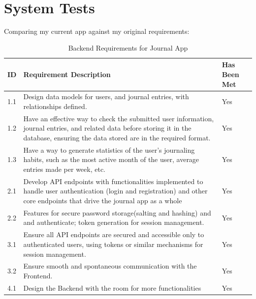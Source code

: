 \section{System Tests}
Comparing my current app against my original requirements:
\begin{table}[H]
    \centering
    \begin{tabular}{|l|p{8cm}|p{4cm}|}  
    \hline
    \textbf{ID} & \textbf{Requirement Description}& \textbf{Has Been Met} \\ \hline
    1.1 & Design data models for users, and journal entries, with relationships defined. & Yes\\ \hline
    
    1.2 & Have an effective way to check the submitted user information, journal entries, and related data before storing it in the database, ensuring the data stored are in the required format. & Yes \\ \hline
    
    1.3 & Have a way to generate statistics of the user's journaling habits, such as the most active month of the user, average entries made per week, etc. & Yes \\ \hline
    
    2.1 & Develop API endpoints with functionalities implemented to handle user authentication (login and registration) and other core endpoints that drive the journal app as a whole & Yes\\ \hline
    
    2.2 & Features for secure password storage(salting and hashing) and and authenticate; token generation for session management.& Yes\\ \hline
    
    3.1 & Ensure all API endpoints are secured and accessible only to authenticated users, using tokens or similar mechanisms for session management.& Yes \\ \hline
    
    3.2 & Ensure smooth and spontaneous communication with the Frontend. & Yes\\ \hline
    4.1 & Design the Backend with the room for more functionalities & Yes \\ \hline
    
    \end{tabular}
    \caption{Backend Requirements for Journal App}
\end{table}

